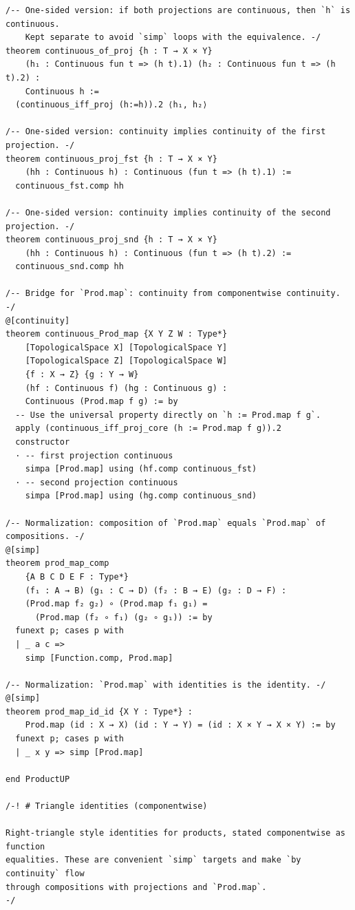 \documentclass[12pt]{article}
\begin{document}
\begin{lstlisting}
/-- One-sided version: if both projections are continuous, then `h` is continuous.
    Kept separate to avoid `simp` loops with the equivalence. -/
theorem continuous_of_proj {h : T → X × Y}
    (h₁ : Continuous fun t => (h t).1) (h₂ : Continuous fun t => (h t).2) :
    Continuous h :=
  (continuous_iff_proj (h:=h)).2 ⟨h₁, h₂⟩

/-- One-sided version: continuity implies continuity of the first projection. -/
theorem continuous_proj_fst {h : T → X × Y}
    (hh : Continuous h) : Continuous (fun t => (h t).1) :=
  continuous_fst.comp hh

/-- One-sided version: continuity implies continuity of the second projection. -/
theorem continuous_proj_snd {h : T → X × Y}
    (hh : Continuous h) : Continuous (fun t => (h t).2) :=
  continuous_snd.comp hh

/-- Bridge for `Prod.map`: continuity from componentwise continuity. -/
@[continuity]
theorem continuous_Prod_map {X Y Z W : Type*}
    [TopologicalSpace X] [TopologicalSpace Y]
    [TopologicalSpace Z] [TopologicalSpace W]
    {f : X → Z} {g : Y → W}
    (hf : Continuous f) (hg : Continuous g) :
    Continuous (Prod.map f g) := by
  -- Use the universal property directly on `h := Prod.map f g`.
  apply (continuous_iff_proj_core (h := Prod.map f g)).2
  constructor
  · -- first projection continuous
    simpa [Prod.map] using (hf.comp continuous_fst)
  · -- second projection continuous
    simpa [Prod.map] using (hg.comp continuous_snd)

/-- Normalization: composition of `Prod.map` equals `Prod.map` of compositions. -/
@[simp]
theorem prod_map_comp
    {A B C D E F : Type*}
    (f₁ : A → B) (g₁ : C → D) (f₂ : B → E) (g₂ : D → F) :
    (Prod.map f₂ g₂) ∘ (Prod.map f₁ g₁) =
      (Prod.map (f₂ ∘ f₁) (g₂ ∘ g₁)) := by
  funext p; cases p with
  | _ a c =>
    simp [Function.comp, Prod.map]

/-- Normalization: `Prod.map` with identities is the identity. -/
@[simp]
theorem prod_map_id_id {X Y : Type*} :
    Prod.map (id : X → X) (id : Y → Y) = (id : X × Y → X × Y) := by
  funext p; cases p with
  | _ x y => simp [Prod.map]

end ProductUP

/-! # Triangle identities (componentwise)

Right-triangle style identities for products, stated componentwise as function
equalities. These are convenient `simp` targets and make `by continuity` flow
through compositions with projections and `Prod.map`.
-/


\end{lstlisting}
\end{document}
